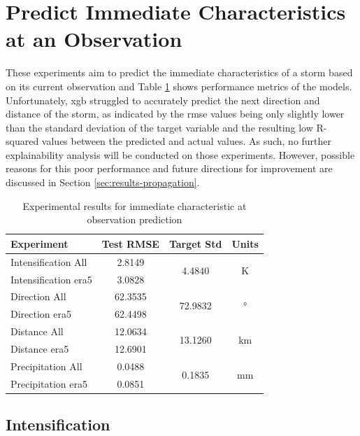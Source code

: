 \clearpage
\section{Predict Immediate Characteristics at an Observation}

These experiments aim to predict the immediate characteristics of a storm based on its current observation and Table \ref{tab:obs_experiment_results} shows performance metrics of the models. Unfortunately, \acrshort{xgb} struggled to accurately predict the next direction and distance of the storm, as indicated by the \acrshort{rmse} values being only slightly lower than the standard deviation of the target variable and the resulting low R-squared values between the predicted and actual values. As such, no further explainability analysis will be conducted on those experiments. However, possible reasons for this poor performance and future directions for improvement are discussed in Section \ref{sec:results-propagation}.

\begin{table}[h!]
\centering
\caption{Experimental results for immediate characteristic at observation prediction}
\label{tab:obs_experiment_results}
\begin{tabular}{lccc}
\hline
\textbf{Experiment} & \textbf{Test RMSE} & \textbf{Target Std} & \textbf{Units} \\
\hline
Intensification All & 2.8149  & \multirow{2}{*}{4.4840}  & \multirow{2}{*}{\unit{\kelvin}} \\
Intensification \acrshort{era5} & 3.0828  & &  \\ \hline
Direction All & 62.3535 & \multirow{2}{*}{72.9832} & \multirow{2}{*}{\unit{\degree}} \\
Direction \acrshort{era5} & 62.4498 & & \\ \hline
Distance All & 12.0634 & \multirow{2}{*}{13.1260} & \multirow{2}{*}{\unit{\km}} \\
Distance \acrshort{era5} & 12.6901 & & \\ \hline
Precipitation All & 0.0488  & \multirow{2}{*}{0.1835}  & \multirow{2}{*}{\unit{\milli\meter}} \\
Precipitation \acrshort{era5} & 0.0851  & & \\
\hline
\end{tabular}
\end{table}

\clearpage
\subsection{Intensification}
\label{sec:results-intensification}

